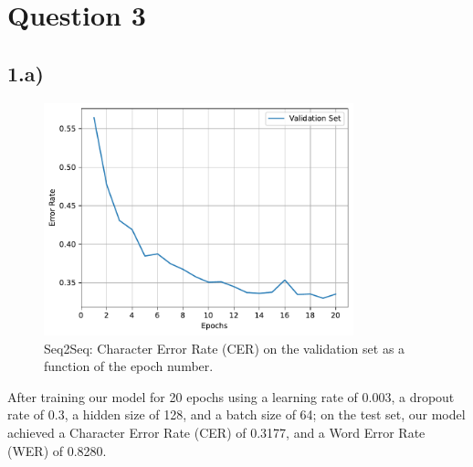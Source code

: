 \documentclass[a4paper, 12pt]{article}
\begin{document}
\section*{Question 3}
\subsection*{1.a)}
\vspace{-0.8cm}
\begin{figure}[H]
    \centering
    \includegraphics[width=0.8\textwidth]{plot/q3/attn_False_err_rate.pdf}
    \caption{Seq2Seq: Character Error Rate (CER) on the validation set as a function of the epoch number.}
\end{figure}

After training our model for 20 epochs using a learning rate of 0.003, a dropout rate of 0.3, a hidden size of 128, and a batch size of 64; on the test set, our model achieved a Character Error Rate (CER) of 0.3177, and a Word Error Rate (WER) of 0.8280.
\end{document}
